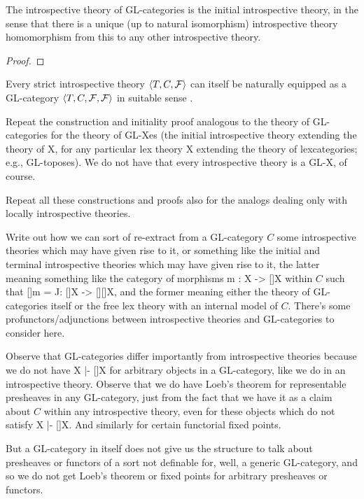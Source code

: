 \begin{theorem}
The introspective theory of GL-categories is the initial introspective theory, in the sense that there is a unique (up to natural isomorphism) introspective theory homomorphism from this to any other introspective theory.
\end{theorem}
\begin{proof}
\TODO
\end{proof}

\begin{construction}
Every strict introspective theory $\langle T, C, \mathcal{F} \rangle$ can itself be naturally equipped as a GL-category $\langle T, C, \mathcal{F}, \mathcal{F} \rangle$ in suitable sense \TODO.
\end{construction}

\begin{TODOblock}
Repeat the construction and initiality proof analogous to the theory of GL-categories for the theory of GL-Xes (the initial introspective theory extending the theory of X, for any particular lex theory X extending the theory of lexcategories; e.g., GL-toposes). We do not have that every introspective theory is a GL-X, of course.

Repeat all these constructions and proofs also for the analogs dealing only with locally introspective theories.
\end{TODOblock}

\begin{TODOblock}
Write out how we can sort of re-extract from a GL-category $C$ some introspective theories which may have given rise to it, or something like the initial and terminal introspective theories which may have given rise to it, the latter meaning something like the category of morphisms m : X -> []X within $C$ such that []m = J: []X -> [][]X, and the former meaning either the theory of GL-categories itself or the free lex theory with an internal model of $C$. There's some profunctors/adjunctions between introspective theories and GL-categories to consider here.
\end{TODOblock}

\begin{TODOblock}
Observe that GL-categories differ importantly from introspective theories because we do not have X |- []X for arbitrary objects in a GL-category, like we do in an introspective theory. Observe that we do have Loeb's theorem for representable presheaves in any GL-category, just from the fact that we have it as a claim about $C$ within any introspective theory, even for these objects which do not satisfy X |- []X. And similarly for certain functorial fixed points.

But a GL-category in itself does not give us the structure to talk about presheaves or functors of a sort not definable for, well, a generic GL-category, and so we do not get Loeb's theorem or fixed points for arbitrary presheaves or functors.
\end{TODOblock}

